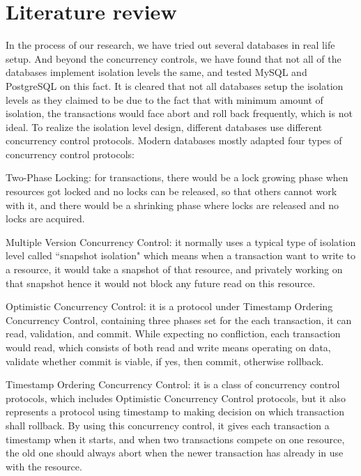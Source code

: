 \section{Literature review}

In the process of our research, we have tried out several databases in real life setup. And beyond the concurrency controls, we have found that not all of the databases implement isolation levels the same\cite{adya2000generalized}, and tested MySQL and PostgreSQL on this fact. It is cleared that not all databases setup the isolation levels as they claimed to be due to the fact that with minimum amount of isolation, the transactions would face abort and roll back frequently, which is not ideal. To realize the isolation level design, different databases use different concurrency control protocols. Modern databases mostly adapted four types of concurrency control protocols:

Two-Phase Locking: for transactions, there would be a lock growing phase when resources got locked and no locks can be released, so that others cannot work with it, and there would be a shrinking phase where locks are released and no locks are acquired.

Multiple Version Concurrency Control: it normally uses a typical type of isolation level called ``snapshot isolation" which means when a transaction want to write to a resource, it would take a snapshot of that resource, and privately working on that snapshot hence it would not block any future read on this resource\cite{berenson1995critique}.

Optimistic Concurrency Control: it is a protocol under Timestamp Ordering Concurrency Control, containing three phases set for the each transaction, it can read, validation, and commit. While expecting no confliction, each transaction would read, which consists of both read and write means operating on data, validate whether commit is viable, if yes, then commit, otherwise rollback.

Timestamp Ordering Concurrency Control: it is a class of concurrency control protocols, which includes Optimistic Concurrency Control protocols, but it also represents a protocol using timestamp to making decision on which transaction shall rollback. By using this concurrency control, it gives each transaction a timestamp when it starts, and when two transactions compete on one resource, the old one should always abort when the newer transaction has already in use with the resource.

